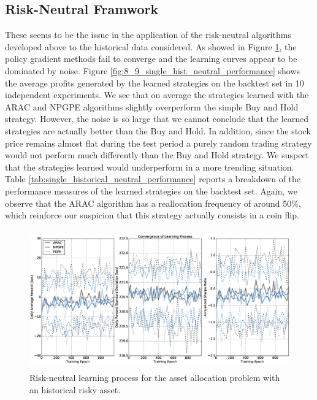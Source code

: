 \subsection{Risk-Neutral Framwork}
These seems to be the issue in the application of the risk-neutral algorithms developed above to the historical data considered. As showed in Figure \ref{fig:8_8_rn_learning_process_historical}, the policy gradient methods fail to converge and the learning curves appear to be dominated by noise. Figure \ref{fig:8_9_single_hist_neutral_performance} shows the average profits generated by the learned strategies on the backtest set in 10 independent experiments. We see that on average the strategies learned with the \gls{ARAC} and \gls{NPGPE} algorithms slightly overperform the simple Buy and Hold strategy. However, the noise is so large that we cannot conclude that the learned strategies are actually better than the Buy and Hold. In addition, since the stock price remains almost flat during the test period a purely random trading strategy would not perform much differently than the Buy and Hold strategy. We suspect that the strategies learned would underperform in a more trending situation. Table \ref{tab:single_historical_neutral_performance} reports a breakdown of the performance measures of the learned strategies on the backtest set. Again, we observe that the \gls{ARAC} algorithm has a reallocation frequency of around 50\%, which reinforce our suspicion that this strategy actually consists in a coin flip. 

\begin{figure}[t!]
	\centering
	\includegraphics[height=6cm,width=1.0\textwidth]{Images/8_8_single_hist_neutral_convergence}
	\caption[Risk-neutral learning process for the historical risky asset.]{Risk-neutral learning process for the asset allocation problem with an historical risky asset.}
	\label{fig:8_8_rn_learning_process_historical}
\end{figure}

